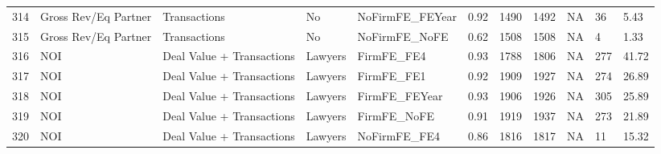 \documentclass{article}
\begin{document}
\begin{table}[H]
\begin{tabular}{rllllllllll}
  314 & Gross Rev/Eq Partner & Transactions & No & NoFirmFE\_FEYear & 0.92 & 1490 & 1492 & NA & 36 & 5.43 \\ 
  315 & Gross Rev/Eq Partner & Transactions & No & NoFirmFE\_NoFE & 0.62 & 1508 & 1508 & NA & 4 & 1.33 \\ 
  316 & NOI & Deal Value + Transactions & Lawyers & FirmFE\_FE4 & 0.93 & 1788 & 1806 & NA & 277 & 41.72 \\ 
  317 & NOI & Deal Value + Transactions & Lawyers & FirmFE\_FE1 & 0.92 & 1909 & 1927 & NA & 274 & 26.89 \\ 
  318 & NOI & Deal Value + Transactions & Lawyers & FirmFE\_FEYear & 0.93 & 1906 & 1926 & NA & 305 & 25.89 \\ 
  319 & NOI & Deal Value + Transactions & Lawyers & FirmFE\_NoFE & 0.91 & 1919 & 1937 & NA & 273 & 21.89 \\ 
  320 & NOI & Deal Value + Transactions & Lawyers & NoFirmFE\_FE4 & 0.86 & 1816 & 1817 & NA & 11 & 15.32 \\ 
   \hline
\end{tabular}
\end{table}
\end{document}
